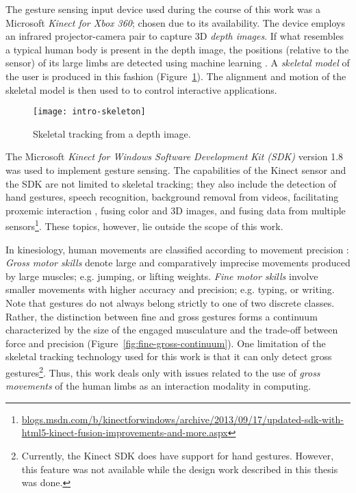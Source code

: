 The gesture sensing input device used during the course of this work was a Microsoft \emph{Kinect for Xbox 360}; chosen due to its availability. The device employs an infrared projector-camera pair to capture 3D \emph{depth images}. If what resembles a typical human body is present in the depth image, the positions (relative to the sensor) of its large limbs are detected using machine learning \parencite{Girshick:2011, Shotton:2011, Shotton:2012, Shotton:2013}. A \emph{skeletal model} of the user is produced in this fashion (Figure~\ref{fig:intro-skeleton}). The alignment and motion of the skeletal model is then used to to control interactive applications.

\begin{figure}[ht]
\centering
\texttt{[image: intro-skeleton]}
\caption{Skeletal tracking from a depth image.}
\label{fig:intro-skeleton}
\end{figure}

The Microsoft \emph{Kinect for Windows Software Development Kit (SDK)} version 1.8 was used to implement gesture sensing. The capabilities of the Kinect sensor and the SDK are not limited to skeletal tracking; they also include the detection of hand gestures, speech recognition, background removal from videos, facilitating proxemic interaction \parencite{Ballendat:2010}, fusing color and 3D images, and fusing data from multiple sensors\footnote{\href{http://blogs.msdn.com/b/kinectforwindows/archive/2013/09/17/updated-sdk-with-html5-kinect-fusion-improvements-and-more.aspx}{blogs.msdn.com/b/kinectforwindows/archive/2013/09/17/updated-sdk-with-html5-kinect-fusion-improvements-and-more.aspx}}. These topics, however, lie outside the scope of this work.

In kinesiology, human movements are classified according to movement precision \parencite{Haibach:2011}: \emph{Gross motor skills} denote large and comparatively imprecise movements produced by large muscles; e.g. jumping, or lifting weights. \emph{Fine motor skills} involve smaller movements with higher accuracy and precision; e.g. typing, or writing. Note that gestures do not always belong strictly to one of two discrete classes. Rather, the distinction between fine and gross gestures forms a continuum characterized by the size of the engaged musculature and the trade-off between force and precision \parencite{Edwards:2010} (Figure~\ref{fig:fine-gross-continuum}). One limitation of the skeletal tracking technology used for this work is that it can only detect gross gestures\footnote{Currently, the Kinect SDK does have support for hand gestures. However, this feature was not available while the design work described in this thesis was done.}. Thus, this work deals only with issues related to the use of \emph{gross movements} of the human limbs as an interaction modality in computing.

